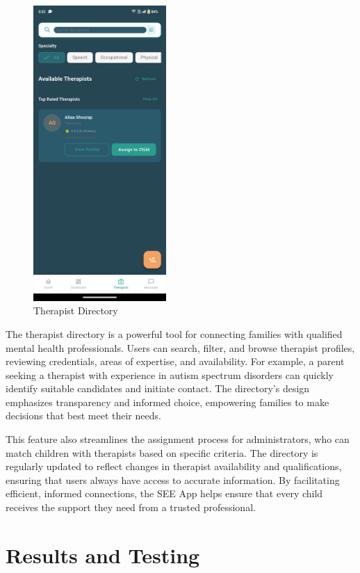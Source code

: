 ﻿\documentclass[12pt,a4paper]{article}
\newcommand{\chaptertitle}[1]{\section{#1}}
\begin{document}
\begin{figure}[H]
    \centering
    \includegraphics[width=0.45\textwidth]{Screenshots/therapists.png}
    \caption{Therapist Directory}
    \label{fig:therapists-directory}
\end{figure}
The therapist directory is a powerful tool for connecting families with qualified mental health professionals. Users can search, filter, and browse therapist profiles, reviewing credentials, areas of expertise, and availability. For example, a parent seeking a therapist with experience in autism spectrum disorders can quickly identify suitable candidates and initiate contact. The directory's design emphasizes transparency and informed choice, empowering families to make decisions that best meet their needs.

This feature also streamlines the assignment process for administrators, who can match children with therapists based on specific criteria. The directory is regularly updated to reflect changes in therapist availability and qualifications, ensuring that users always have access to accurate information. By facilitating efficient, informed connections, the SEE App helps ensure that every child receives the support they need from a trusted professional.

\newpage

\chaptertitle{Results and Testing}
\end{document}
